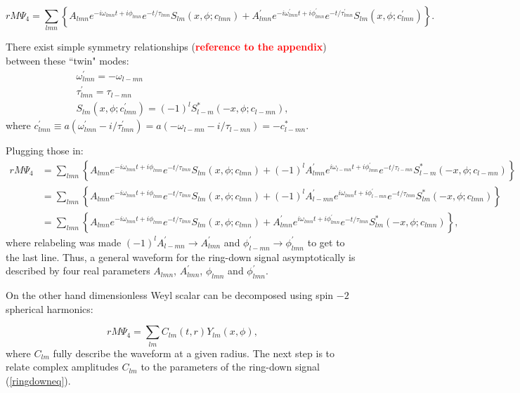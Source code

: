 \documentclass[10pt]{article}
\begin{document}
\begin{equation}
rM\Psi_4 = \sum_{lmn} \left\{ A_{lmn} e^{-i\omega_{lmn}t+i\phi_{lmn}}e^{-t/\tau_{lmn}} S_{lm}(x,\phi ; c_{lmn}) + A^{'}_{lmn} e^{-i\omega^{'}_{lmn}t+i\phi^{'}_{lmn}}e^{-t/\tau^{'}_{lmn}} S_{lm}(x,\phi ; c^{'}_{lmn}) \right\}.
\end{equation}

\noindent
There exist simple symmetry relationships (\textcolor{red}{\bf reference to the appendix}) between these ``twin" modes:
\begin{equation}
\begin{array}{l}
\omega^{'}_{lmn} = -\omega_{l-mn} \\
\tau^{'}_{lmn} = \tau_{l-mn} \\
S_{lm}(x,\phi ;c^{'}_{lmn}) = (-1)^l S^{*}_{l-m}(-x,\phi; c_{l-mn}),
\end{array} 
\end{equation}
where $c^{'}_{lmn} \equiv a( \omega^{'}_{lmn} - i/\tau^{'}_{lmn} ) = a( -\omega_{l-mn} - i/\tau_{l-mn} ) = - c^{*}_{l-mn}$.

\noindent
Plugging those in:
\begin{align} \label{ringdowneq}
\nonumber rM\Psi_4 &= \sum_{lmn} \left\{ A_{lmn} e^{-i\omega_{lmn}t+i\phi_{lmn}}e^{-t/\tau_{lmn}} S_{lm}(x,\phi; c_{lmn}) +  (-1)^l A^{'}_{lmn} e^{i\omega_{l-mn}t+i\phi^{'}_{lmn}}e^{-t/\tau_{l-mn}}S^{*}_{l-m}(-x,\phi; c_{l-mn}) \right\}\\
\nonumber 	 	   &=\sum_{lmn} \left\{ A_{lmn} e^{-i\omega_{lmn}t+i\phi_{lmn}}e^{-t/\tau_{lmn}} S_{lm}(x, \phi ;c_{lmn}) +  (-1)^l A^{'}_{l-mn} e^{i\omega_{lmn}t+i\phi^{'}_{l-mn}}e^{-t/\tau_{lmn}} S^{*}_{lm}(-x, \phi; c_{lmn}) \right\}\\
				   &=\sum_{lmn} \left\{ A_{lmn} e^{-i\omega_{lmn}t+i\phi_{lmn}}e^{-t/\tau_{lmn}} S_{lm}(x, \phi ;c_{lmn}) +  A^{'}_{lmn} e^{i\omega_{lmn}t+i\phi^{'}_{lmn}}e^{-t/\tau_{lmn}} S^{*}_{lm 	}(-x, \phi; c_{lmn}) \right\},
\end{align}
where relabeling was made $(-1)^l A^{'}_{l-mn} \rightarrow A^{'}_{lmn}$ and $\phi^{'}_{l-mn} \rightarrow \phi^{'}_{lmn}$ to get to the last line. Thus, a general waveform for the ring-down signal asymptotically is described by four real parameters $A_{lmn}$, $A^{'}_{lmn}$, $\phi_{lmn}$ and $\phi^{'}_{lmn}$.

On the other hand dimensionless Weyl scalar can be decomposed using spin $-2$ spherical harmonics:

\begin{equation}
rM\Psi_4 = \sum_{lm} C_{lm}(t,r) Y_{lm}(x, \phi),
\end{equation} 
where $C_{lm}$ fully describe the waveform at a given radius. The next step is to relate complex amplitudes $C_{lm}$ to the parameters of the ring-down signal (\ref{ringdowneq}). 
\end{document}
